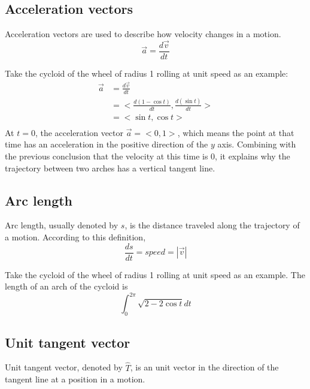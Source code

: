\documentclass{article}
\begin{document}
\subsection{Acceleration vectors}

Acceleration vectors are used to describe how velocity changes in a motion.
\begin{equation*}
  \vec{a} = \frac{d\vec{v}}{dt}
\end{equation*}

Take the cycloid of the wheel of radius 1 rolling at unit speed as an example:
\begin{equation*}
\begin{split}
  \vec{a} &= \frac{d\vec{v}}{dt} \\
          &= <\frac{d(1 - \cos t)}{dt}, \frac{d(\sin t)}{dt}> \\
          &= <\sin t, \cos t> \\
\end{split}
\end{equation*}
At $t = 0$, the acceleration vector $\vec{a} = <0, 1>$, which means the point at 
that time has an acceleration in the positive direction of the $y$ axis. 
Combining with the previous conclusion that the velocity at this time is 0, it 
explains why the trajectory between two arches has a vertical tangent line.

\subsection{Arc length}

Arc length, usually denoted by $s$, is the distance traveled along the 
trajectory of a motion. According to this definition,
\begin{equation*}
  \frac{ds}{dt} = speed = |\vec{v}|
\end{equation*}

Take the cycloid of the wheel of radius 1 rolling at unit speed as an example. 
The length of an arch of the cycloid is
\begin{equation*}
  \int_{0}^{2\pi} \sqrt{2 - 2\cos t} dt
\end{equation*}

\subsection{Unit tangent vector}

Unit tangent vector, denoted by $\hat{T}$, is an unit vector in the direction of 
the tangent line at a position in a motion.
\end{document}
